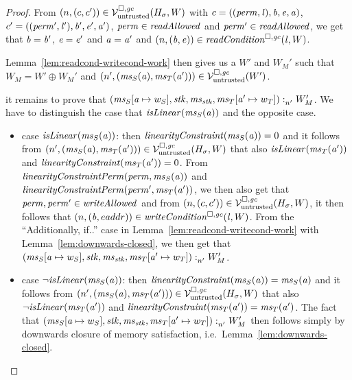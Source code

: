 \begin{proof}
  From $\npair{(c,c')}\in\lrv(H_\sigma,W)$ with $c = ((\perm,\lin),\baddr,\eaddr,\aaddr)$, $c' = ((\perm',\lin'),\baddr',\eaddr',\aaddr')$, $\perm \in \readAllowed{}$ and $\perm' \in \readAllowed{}$, we get that $\baddr = \baddr'$, $\eaddr = \eaddr'$ and $\aaddr = \aaddr'$ and $\npair{(\baddr,\eaddr)} \in \readCond{\lin,W}$.

  Lemma~\ref{lem:readcond-writecond-work} then gives us a $W'$ and $W_M'$ such that $W_M = W' \oplus W_M'$ and $\npair[n']{(\ms_S(\aaddr),\ms_T(\aaddr'))} \in \lrv(W')$.

  it remains to prove that $\memSat[n']{(\ms_S\update{\aaddr}{w_S},\stk,\ms_\stk,\ms_T\update{\aaddr'}{w_T})}{W_M'}$.
  We have to distinguish the case that $\isLinear{\ms_S(\aaddr)}$ and the opposite case.
  \begin{itemize}
  \item case $\isLinear{\ms_S(\aaddr)}$: then $\linCons{\ms_S(\aaddr)} = 0$ and it follows from $\npair[n']{(\ms_S(\aaddr),\ms_T(\aaddr'))}\in\lrv(H_\sigma,W)$ that also $\isLinear{\ms_T(\aaddr')}$  and $\linCons{\ms_T(\aaddr')} = 0$.
    From $\linConsPerm{\perm}{\ms_S(\aaddr)}$ and $\linConsPerm{\perm'}{\ms_T(\aaddr')}$, we then also get that $\perm,\perm' \in \writeAllowed{}$ and from $\npair{(c,c')}\in\lrv(H_\sigma,W)$, it then follows that $\npair{(\baddr,eaddr)} \in \writeCond{\lin,W}$.
    From the ``Additionally, if..'' case in Lemma~\ref{lem:readcond-writecond-work} with Lemma~\ref{lem:downwards-closed}, we then get that $\memSat[n']{(\ms_S\update{\aaddr}{w_S},\stk,\ms_\stk,\ms_T\update{\aaddr'}{w_T})}{W_M'}$.

  \item case $\neg\isLinear{\ms_S(\aaddr)}$: then $\linCons{\ms_S(\aaddr)} = \ms_S(\aaddr)$ and it follows from $\npair[n']{(\ms_S(\aaddr),\ms_T(\aaddr'))}\in\lrv(H_\sigma,W)$ that also $\neg\isLinear{\ms_T(\aaddr')}$ 
    and $\linCons{\ms_T(\aaddr')} = \ms_T(\aaddr')$.
    The fact that $\memSat[n']{(\ms_S\update{\aaddr}{w_S},\stk,\ms_\stk,\ms_T\update{\aaddr'}{w_T})}{W_M'}$ then follows simply by downwards closure of memory satisfaction, i.e.~Lemma~\ref{lem:downwards-closed}.
  \end{itemize}
\end{proof}

